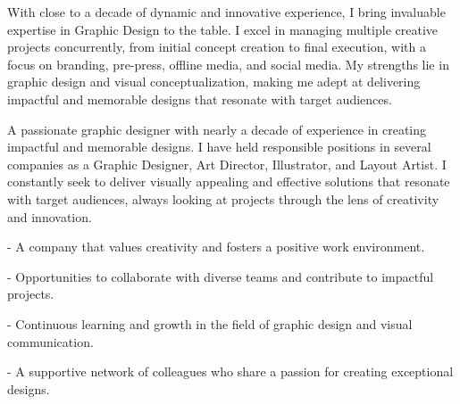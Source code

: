 \documentclass[10pt,a4paper,ragged2e,withhyper]{altacv}
\begin{document}



\makecvheader


\begin{raggedright}
With close to a decade of dynamic and innovative experience, I bring invaluable expertise in Graphic Design to the table. I excel in managing multiple creative projects concurrently, from initial concept creation to final execution, with a focus on branding, pre-press, offline media, and social media. My strengths lie in graphic design and visual conceptualization, making me adept at delivering impactful and memorable designs that resonate with target audiences.
\end{raggedright}

\vspace{0.5cm}

\begin{paracol}{2}



    \begin{raggedright}
        A passionate graphic designer with nearly a decade of experience in creating impactful and memorable designs. I have held responsible positions in several companies as a Graphic Designer, Art Director, Illustrator, and Layout Artist.
        I constantly seek to deliver visually appealing and effective solutions that resonate with target audiences, always looking at projects through the lens of creativity and innovation.
    \end{raggedright}
    
    
    \switchcolumn
    
    
    \begin{raggedright}

        - A company that values creativity and fosters a positive work environment.
        
        - Opportunities to collaborate with diverse teams and contribute to impactful projects.
        
        - Continuous learning and growth in the field of graphic design and visual communication.
        
        - A supportive network of colleagues who share a passion for creating exceptional designs.
        
        
        \end{raggedright}

\end{paracol}
\end{document}
